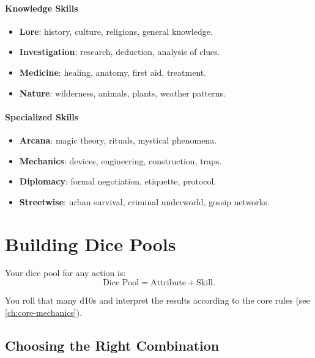 \paragraph{Knowledge Skills}
\begin{itemize}
  \item \textbf{Lore}: history, culture, religions, general knowledge.
  \item \textbf{Investigation}: research, deduction, analysis of clues.
  \item \textbf{Medicine}: healing, anatomy, first aid, treatment.
  \item \textbf{Nature}: wilderness, animals, plants, weather patterns.
\end{itemize}

\paragraph{Specialized Skills}
\begin{itemize}
  \item \textbf{Arcana}: magic theory, rituals, mystical phenomena.
  \item \textbf{Mechanics}: devices, engineering, construction, traps.
  \item \textbf{Diplomacy}: formal negotiation, etiquette, protocol.
  \item \textbf{Streetwise}: urban survival, criminal underworld, gossip networks.
\end{itemize}

\newpage
\section{Building Dice Pools}
\label{sec:dice-pools}

Your dice pool for any action is:
\[
\text{Dice Pool} = \text{Attribute} + \text{Skill}.
\]

You roll that many d10s and interpret the results according to the core rules
(see \ref{ch:core-mechanics}).

\subsection{Choosing the Right Combination}
\label{sec:attribute-skill-pairs}

